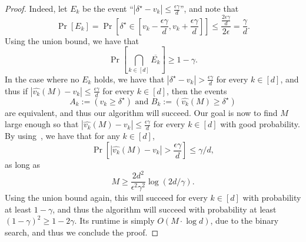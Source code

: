 \begin{proof}
Indeed, let $E_k$ be the event ``$|\delta^\star - v_k| \leq \frac{\epsilon \gamma}{d}$'', and note that 
\[
	\Pr[E_k] = \Pr\left[\delta^\star \in \left[v_k - \frac{\epsilon \gamma}{d}, v_k + \frac{\epsilon \gamma}{d}\right]\right] \leq \frac{\frac{2\epsilon \gamma}{d}}{2\epsilon} = \frac{\gamma}{d}.
\]
Using the union bound, we have that 
\[
	\Pr\left[\bigcap_{k \in [d]} \overline{E_k}\right] \geq 1 - \gamma.
\]
In the case where no $E_k$ holds, we have that $|\delta^\star - v_k| > \frac{\epsilon \gamma}{d}$ for every $k \in [d]$, and thus 
if $|\hat{v_k}(M)  - v_k| \leq \frac{\epsilon \gamma}{d}$ for every $k \in [d]$, then the events 
\[
	A_k := \left(v_k \geq \delta^\star \right) \text{ and }  B_k := \left(\hat{v_k}(M) \geq \delta^\star\right)
\]
are equivalent, and thus our algorithm will succeed. Our goal is now to find $M$ large enough so that 
$|\hat{v_k}(M)  - v_k| \leq \frac{\epsilon \gamma}{d}$ for every $k \in [d]$ with good probability. By using~, we have that for any $k \in [d]$,
\[
	\Pr\left[|\hat{v_k}(M) - v_k| > \frac{\epsilon \gamma}{d}\right] \leq  \gamma/d,
\]  as long as 
\[ 
	M \geq \frac{2d^2}{\epsilon^2 \gamma^2}  \log(2d/\gamma).
\]
Using the union bound again, this will succeed for every $k \in [d]$ with probability at least $1 - \gamma$, and thus the algorithm will succeed with probability at least $(1-\gamma)^2  \geq 1 - 2\gamma$. Its runtime is simply
$O(M \cdot \log d)$, due to the binary search, and thus we conclude the proof.


\end{proof}
